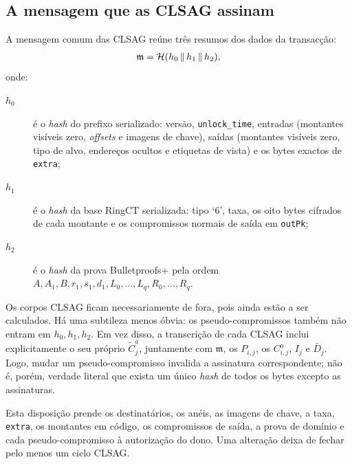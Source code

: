 \subsection{A mensagem que as CLSAG assinam}

%
A mensagem comum das CLSAG reúne três resumos dos dados da transacção:
\begin{align}
 \mathfrak m=\mathcal H(h_0\,\|\,h_1\,\|\,h_2),
 \label{eq:transaction-pre-clsag-hash}
\index{transaccao@transacção!mensagem assinada@mensagem assinada}
\end{align}
onde:

\begin{description}
    \item[\(h_0\)] é o \emph{hash} do prefixo serializado: versão,
    \texttt{unlock\_time}, entradas (montantes visíveis zero, \emph{offsets}
    e imagens de chave), saídas (montantes visíveis zero, tipo de alvo,
    endereços ocultos e etiquetas de vista) e os bytes exactos de
    \texttt{extra};

    \item[\(h_1\)] é o \emph{hash} da base RingCT serializada: tipo `6',
    taxa, os oito bytes cifrados de cada montante e os compromissos normais
    de saída em \texttt{outPk};

    \item[\(h_2\)] é o \emph{hash} da prova Bulletproofs+ pela ordem
    \(A,A_1,B,r_1,s_1,d_1,L_0,\ldots,L_q,R_0,\ldots,R_q\).
\end{description}

Os corpos CLSAG ficam necessariamente de fora, pois ainda estão a ser
calculados. Há uma subtileza menos óbvia: os pseudo-compromissos também não
entram em \(h_0,h_1,h_2\). Em vez disso, a transcrição de cada CLSAG inclui
explicitamente o seu próprio \(\widetilde C^a_j\), juntamente com
\(\mathfrak m\), os \(P_{i,j}\), os \(C^a_{i,j}\), \(I_j\) e \(\bar D_j\). Logo,
mudar um pseudo-compromisso invalida a assinatura correspondente; não é, porém,
verdade literal que exista um único \emph{hash} de todos os bytes excepto as
assinaturas.

Esta disposição prende os destinatários, os anéis, as imagens de chave, a
taxa, \texttt{extra}, os montantes em código, os compromissos de saída, a
prova de domínio e cada pseudo-compromisso à autorização do dono. Uma
alteração deixa de fechar pelo menos um ciclo CLSAG.

